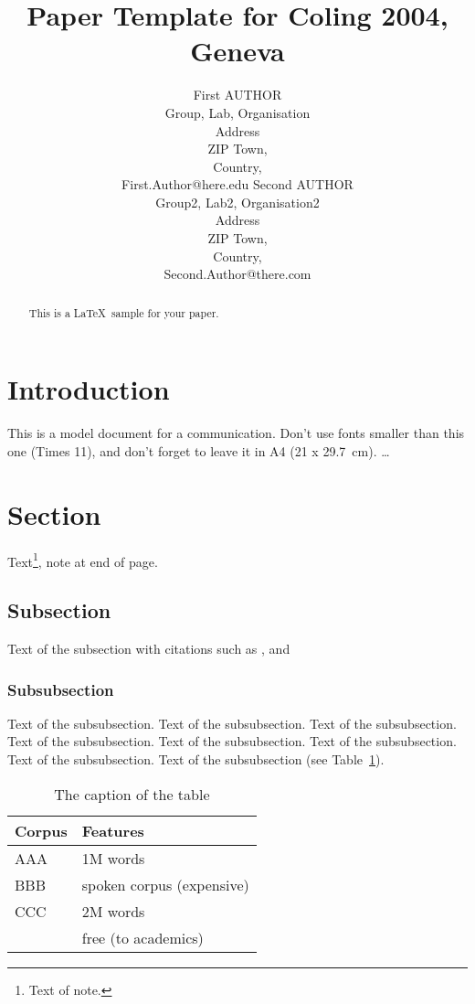 \documentclass[11pt]{article}
\title{Paper Template for Coling 2004, Geneva}
\author
{First AUTHOR 
\\ Group, Lab, Organisation 
\\ Address 
\\ ZIP Town,
\\ Country, 
\\ First.Author@here.edu
\And
Second AUTHOR
\\ Group2, Lab2, Organisation2
\\ Address
\\ ZIP Town,
\\ Country,
\\ Second.Author@there.com }
\begin{document}
\maketitle


\begin{abstract}
This is a \LaTeX\ sample for your paper.
\end{abstract}

\section{Introduction}

This is a 
model document for a communication. Don't use fonts smaller than this
one (Times 11), and don't forget to leave it in A4 (21 x 29.7~cm).
 \ldots


\section{Section}

Text\footnote{Text of note.}, note at end of page.


\subsection{Subsection}

Text of the subsection with citations such as 
\cite{Spa72}, \cite{Kay86} and \cite{MosWal64} 

 
\subsubsection{Subsubsection}

Text of the subsubsection.
Text of the subsubsection.
Text of the subsubsection.
Text of the subsubsection.
Text of the subsubsection.
Text of the subsubsection.
Text of the subsubsection.
Text of the subsubsection (see Table~\ref{table1}).

\begin{table}[h]
 \begin{center}
\begin{tabular}{|l|l|}

      \hline
      Corpus & Features\\
      \hline\hline
      AAA & 1M words\\
      BBB & spoken corpus (expensive)\\
      CCC & 2M words\\
        & free (to academics)\\
      \hline

\end{tabular}
\caption{The caption of the table}\label{table1}
 \end{center}
\end{table}
\end{document}

